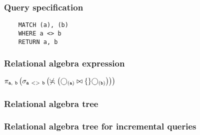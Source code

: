 	\subsubsection*{Query specification}

	\begin{lstlisting}
	MATCH (a), (b)
	WHERE a <> b
	RETURN a, b
	\end{lstlisting}


	\subsubsection*{Relational algebra expression}

	$\projection{\var{a},~\var{b}} \left(\selection{\mathtt{a~<>~b}} \left(\alldifferent{} \left(\getvertices{a}{} \join \{\} \getvertices{b}{}\right)\right)\right)$

	\subsubsection*{Relational algebra tree}


	\subsubsection*{Relational algebra tree for incremental queries}

